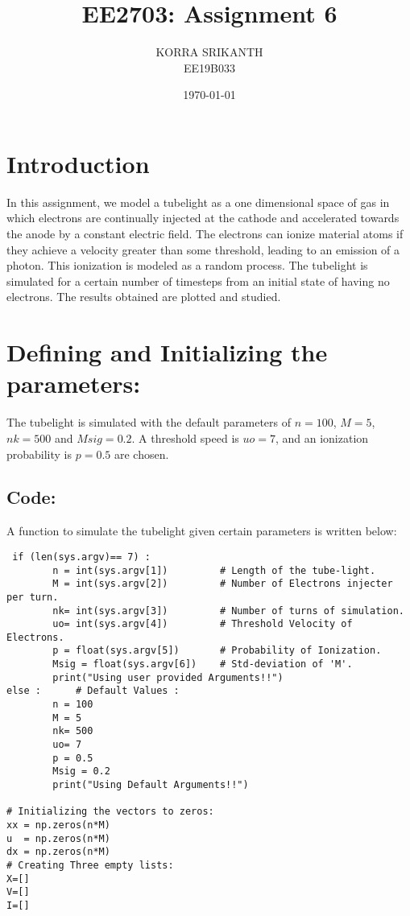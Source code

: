 \documentclass[11pt, a4paper, twoside]{article}
\title{EE2703: Assignment 6}
\author{KORRA SRIKANTH \\ \small EE19B033}
\date{\today}
\begin{document}
	
	
\maketitle %
  \section*{Introduction}
   

In this assignment, we model a tubelight as a one dimensional space of
gas in which electrons are continually injected at the cathode and
accelerated towards the anode by a constant electric field. The
electrons can ionize material atoms if they achieve a velocity greater
than some threshold, leading to an emission of a photon. This ionization
is modeled as a random process. The tubelight is simulated for a certain
number of timesteps from an initial state of having no electrons. The
results obtained are plotted and studied.


\section*{Defining and Initializing the parameters:}
The tubelight is simulated with the default parameters of \(n=100\),
\(M=5\), \(nk=500\) and \(Msig=0.2\). A threshold speed is \(uo = 7\), and
an ionization probability is \(p=0.5\) are chosen.

\subsection*{Code:}
A function to simulate the tubelight given certain parameters is written
below:
\begin{verbatim}
 if (len(sys.argv)== 7) :
        n = int(sys.argv[1])         # Length of the tube-light.
        M = int(sys.argv[2])         # Number of Electrons injecter per turn.
        nk= int(sys.argv[3])         # Number of turns of simulation.
        uo= int(sys.argv[4])         # Threshold Velocity of Electrons.
        p = float(sys.argv[5])       # Probability of Ionization.
        Msig = float(sys.argv[6])    # Std-deviation of 'M'.
        print("Using user provided Arguments!!")
else :      # Default Values :
        n = 100                      
        M = 5                       
        nk= 500                    
        uo= 7                       
        p = 0.5                     
        Msig = 0.2  
        print("Using Default Arguments!!")

# Initializing the vectors to zeros:
xx = np.zeros(n*M)                   
u  = np.zeros(n*M)
dx = np.zeros(n*M)
# Creating Three empty lists:
X=[]                                
V=[]
I=[]

\end{verbatim}
\end{document}

